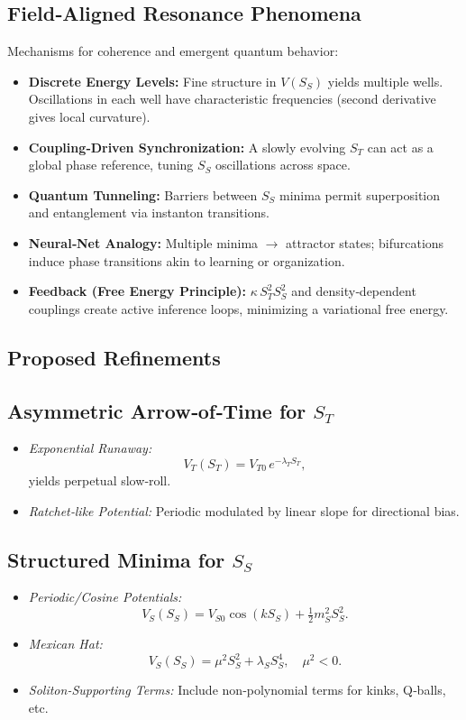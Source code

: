 \documentclass[11pt,a4paper]{article} %
\begin{document}
\subsection{Field‐Aligned Resonance Phenomena}
Mechanisms for coherence and emergent quantum behavior:

\begin{itemize}
  \item \textbf{Discrete Energy Levels:} Fine structure in $V(S_S)$ yields multiple wells. Oscillations in each well have characteristic frequencies (second derivative gives local curvature).
  \item \textbf{Coupling‐Driven Synchronization:} A slowly evolving $S_T$ can act as a global phase reference, tuning $S_S$ oscillations across space.
  \item \textbf{Quantum Tunneling:} Barriers between $S_S$ minima permit superposition and entanglement via instanton transitions.
  \item \textbf{Neural‐Net Analogy:} Multiple minima $\to$ attractor states; bifurcations induce phase transitions akin to learning or organization.
  \item \textbf{Feedback (Free Energy Principle):} $\kappa\,S_T^2 S_S^2$ and density‐dependent couplings create active inference loops, minimizing a variational free energy.
\end{itemize}

\subsection{Proposed Refinements}
\subsection{Asymmetric Arrow‐of‐Time for $S_T$}
\begin{itemize}
  \item \emph{Exponential Runaway:} 
    \[
    V_T(S_T) = V_{T0}\,e^{-\lambda_T S_T},
    \]
    yields perpetual slow‐roll.
  \item \emph{Ratchet‐like Potential:} Periodic modulated by linear slope for directional bias.
\end{itemize}

\subsection{Structured Minima for $S_S$}
\begin{itemize}
  \item \emph{Periodic/Cosine Potentials:} 
    \[
    V_S(S_S) = V_{S0}\cos(k S_S) + \tfrac12 m_S^2 S_S^2.
    \]
  \item \emph{Mexican Hat:} 
    \[
    V_S(S_S) = \mu^2 S_S^2 + \lambda_S S_S^4,\quad \mu^2<0.
    \]
  \item \emph{Soliton‐Supporting Terms:} Include non‐polynomial terms for kinks, Q‐balls, etc.
\end{itemize}
\end{document}
